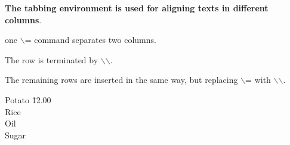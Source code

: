 \documentclass[11pt,a4paper]{article}
\begin{document}
    {\bf The tabbing environment is used for aligning texts in different columns}.
    \vspace{5mm}\huge

    one $\backslash$= command separates two columns.

    The row is terminated by $\backslash$$\backslash$.

    The remaining rows are inserted in the same way, but replacing $\backslash$= with $\backslash$$\backslash$.

    \huge\vspace{20mm}
    \begin{tabbing} 
        Potato \= 12.00\\ %
        Rice \\  %
        Oil \\ %
        Sugar   %
    \end{tabbing}
\end{document}
